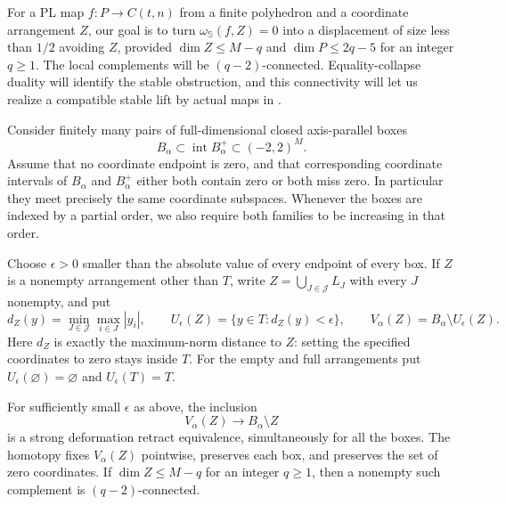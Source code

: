For a PL map $f:P\to C(t,n)$ from a finite polyhedron and a coordinate
arrangement $Z$, our goal is to turn $\omega_{\mathbb S}(f,Z)=0$
into a displacement of size less
than $1/2$ avoiding $Z$, provided
$\dim Z\le M-q$ and $\dim P\le2q-5$ for an integer $q\ge1$.
The local complements will be $(q-2)$-connected.  Equality-collapse
duality will identify the stable obstruction, and this connectivity
will let us realize a compatible stable lift by actual maps in
.

Consider finitely many pairs of full-dimensional closed axis-parallel
boxes
\begin{equation}\label{eq:box-pairs}
 B_\alpha\subset\operatorname{int}B_\alpha^+
 \subset(-2,2)^M.
\end{equation}
Assume that no coordinate endpoint is zero, and that corresponding
coordinate intervals of $B_\alpha$ and $B_\alpha^+$ either both contain
zero or both miss zero.  In particular they meet precisely the same
coordinate subspaces.  Whenever the boxes are indexed by a partial
order, we also require both families to be increasing in that order.

Choose $\epsilon>0$ smaller than the absolute value of every endpoint
of every box.  If $Z$ is a nonempty arrangement other than $T$, write
$Z=\bigcup_{J\in\mathcal J}L_J$ with every $J$ nonempty, and put
\[
 d_Z(y)=\min_{J\in\mathcal J}\max_{i\in J}|y_i|,
 \qquad U_\epsilon(Z)=\{y\in T:d_Z(y)<\epsilon\},
 \qquad V_\alpha(Z)=B_\alpha\setminus U_\epsilon(Z).
\]
Here $d_Z$ is exactly the maximum-norm distance to $Z$: setting the
specified coordinates to zero stays inside $T$.  For the empty and full
arrangements put $U_\epsilon(\varnothing)=\varnothing$ and
$U_\epsilon(T)=T$.

\begin{lemma}\label{lem:coordinate-thickening}
For sufficiently small $\epsilon$ as above, the inclusion
\[
 V_\alpha(Z)\longrightarrow B_\alpha\setminus Z
\]
is a strong deformation retract equivalence, simultaneously for all the
boxes.  The homotopy fixes $V_\alpha(Z)$ pointwise, preserves each box,
and preserves the set of zero coordinates.  If
$\dim Z\le M-q$ for an integer $q\ge1$, then a nonempty such complement is
$(q-2)$-connected.
\end{lemma}

